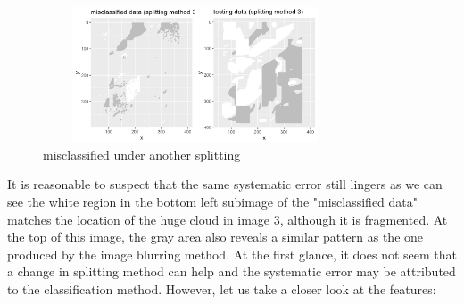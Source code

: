 \documentclass[jou]{apa}%
\begin{document}
\begin{figure}[H] \centering\hspace*{-0.5cm} \includegraphics[width=9cm, height = 4cm]{splitmis}\vspace*{-0.2cm} \caption{misclassified under another splitting}\end{figure}
It is reasonable to suspect that the same systematic error still lingers as we can see the white region in the bottom left subimage of the "misclassified data" matches the location of the huge cloud in image 3, although it is fragmented. At the top of this image, the gray area also reveals a similar pattern as the one produced by the image blurring method. At the first glance, it does not seem that a change in splitting method can help and the systematic error may be attributed to the classification method. However, let us take a closer look at the features:
\end{document}
